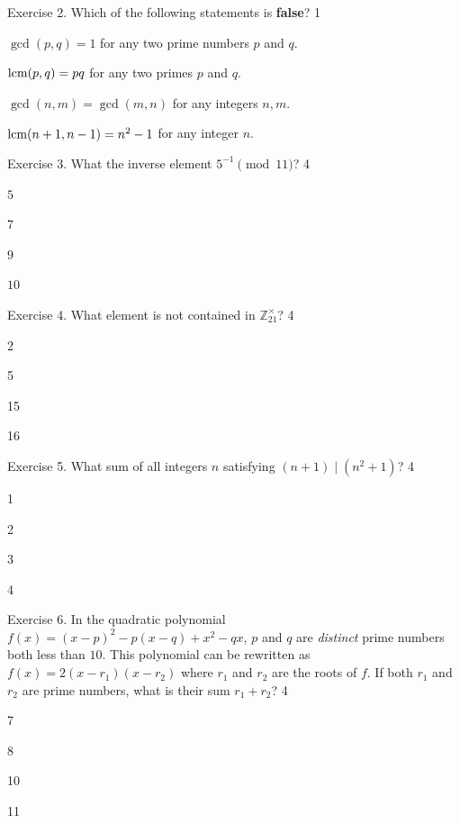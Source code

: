 \documentclass[../lecture-notes-148x210.tex]{subfiles}
\begin{document}
\begin{xexercise}
    {Exercise 2.}
    {Which of the following statements is \textbf{false}?}
    {1}
    {
        \item $\gcd(p,q)=1$ for any two prime numbers $p$ and $q$.
        \item $\text{lcm}(p,q)=pq$ for any two primes $p$ and $q$.
        \item $\gcd(n,m) = \gcd(m,n)$ for any integers $n,m$.
        \item $\text{lcm}(n+1,n-1) = n^2-1$ for any integer $n$.
    }
\end{xexercise}

\begin{xexercise}
    {Exercise 3.}
    {What the inverse element $5^{-1} \pmod{11}$?}
    {4}
    {
        \item $5$
        \item $7$
        \item $9$
        \item $10$
    }
\end{xexercise}

\begin{xexercise}
    {Exercise 4.}
    {What element is not contained in $\mathbb{Z}_{21}^{\times}$?}
    {4}
    {
        \item 2 
        \item 5
        \item 15
        \item 16
    }
\end{xexercise}

\begin{xexercise}
    {Exercise 5.}
    {What sum of all integers $n$ satisfying $(n + 1) \mid (n^2 + 1)$?}
    {4}
    {
        \item 1
        \item 2
        \item 3
        \item 4
    }
\end{xexercise}

\begin{xexercise}
    {Exercise 6.} { In the quadratic polynomial $f(x) = (x-p)^2-p(x-q)+x^2-qx$,
    $p$ and $q$ are \emph{distinct} prime numbers both less than $10$. This
    polynomial can be rewritten as $f(x) = 2(x-r_1)(x-r_2)$ where $r_1$ and
    $r_2$ are the roots of $f$. If both $r_1$ and $r_2$ are prime numbers, what
    is their sum $r_1+r_2$? } {4} {
        \item 7
        \item 8
        \item 10
        \item 11
    }
\end{xexercise}
\end{document}
